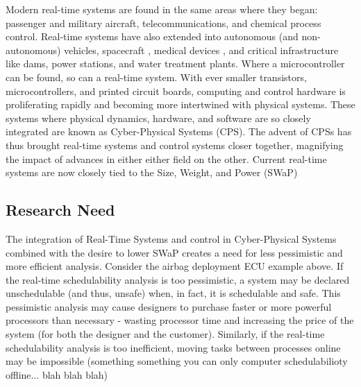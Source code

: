 Modern real-time systems are found in the same areas where they began: passenger and military aircraft, telecommunications, and chemical process control.
Real-time systems have also extended into autonomous (and non-autonomous) vehicles, spacecraft \cite{vavra_real-time_2018}, medical devices \cite{jiang_real-time_2010}, and critical infrastructure like dams, power stations, and water treatment plants.
Where a microcontroller can be found, so can a real-time system.
With ever smaller transistors, microcontrollers, and printed circuit boards, computing and control hardware is proliferating rapidly and becoming more intertwined with physical systems.
These systems where physical dynamics, hardware, and software are so closely integrated are known as Cyber-Physical Systems (CPS).
The advent of CPSs has thus brought real-time systems and control systems closer together, magnifying the impact of advances in either either field on the other.
Current real-time systems are now closely tied to the Size, Weight, and Power (SWaP)


\subsection{Research Need}
The integration of Real-Time Systems and control in Cyber-Physical Systems combined with the desire to lower SWaP creates a need for less pessimistic and more efficient analysis.
Consider the airbag deployment ECU example above.
If the real-time schedulability analysis is too pessimistic, a system may be declared unschedulable (and thus, unsafe) when, in fact, it is schedulable and safe.
This pessimistic analysis may cause designers to purchase faster or more powerful processors than necessary - wasting processor time and increasing the price of the system (for both the designer and the customer).
Similarly, if the real-time schedulability analysis is too inefficient, moving tasks between processes online may be impossible (something something you can only computer schedulabilioty offline... blah blah blah)

